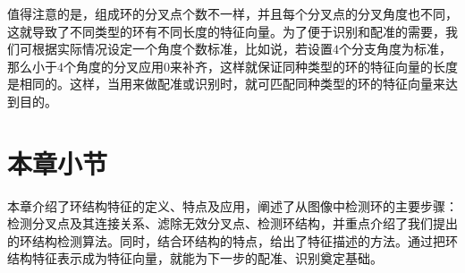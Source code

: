 值得注意的是，组成环的分叉点个数不一样，并且每个分叉点的分叉角度也不同，这就导致了不同类型的环有不同长度的特征向量。为了便于识别和配准的需要，我们可根据实际情况设定一个角度个数标准，比如说，若设置$4$个分支角度为标准，那么小于$4$个角度的分叉应用$0$来补齐，这样就保证同种类型的环的特征向量的长度是相同的。这样，当用来做配准或识别时，就可匹配同种类型的环的特征向量来达到目的。

\section{本章小节}
\label{}

本章介绍了环结构特征的定义、特点及应用，阐述了从图像中检测环的主要步骤：检测分叉点及其连接关系、滤除无效分叉点、检测环结构，并重点介绍了我们提出的环结构检测算法。同时，结合环结构的特点，给出了特征描述的方法。通过把环结构特征表示成为特征向量，就能为下一步的配准、识别奠定基础。
